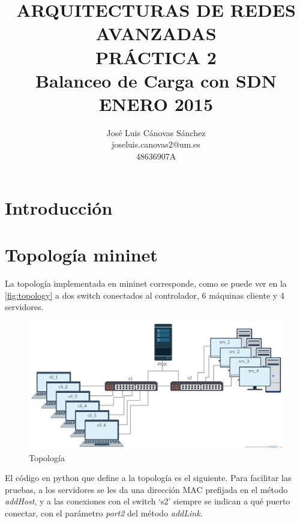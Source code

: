\documentclass{article}
\author{José Luis Cánovas Sánchez\\joseluis.canovas2@um.es\\48636907A}
\title{ARQUITECTURAS DE REDES AVANZADAS\\PRÁCTICA 2\\Balanceo de Carga con SDN\\ ENERO 2015}
\date{}
\begin{document}
\maketitle

\begin{abstract}

\end{abstract}

\tableofcontents

\section{Introducción}

\section{Topología mininet}

La topología implementada en mininet corresponde, como se puede ver en la \autoref{fig:topology} a dos switch conectados al controlador, 6 máquinas cliente y 4 servidores.


\begin{figure}[!h]
	\centering
	\includegraphics[scale=0.29]{images/topology.png}
	\caption{Topología}
	\label{fig:topology}
\end{figure}

\hfill

El código en python que define a la topología es el siguiente. Para facilitar las pruebas, a los servidores se les da una dirección MAC prefijada en el método \textit{addHost}, y a las conexiones con el switch `s2'  siempre se indican a qué puerto conectar, con el parámetro \textit{port2} del método \textit{addLink}.
\end{document}

